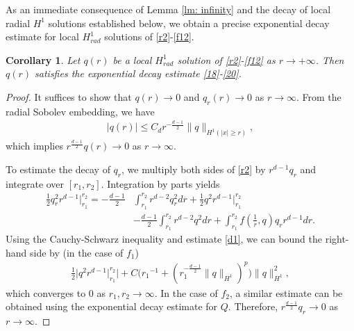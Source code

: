 \documentclass[12pt]{amsart}
\newtheorem{corollary}[theorem]{Corollary}
\newtheorem{remark}[theorem]{Remark}
\begin{document}
As an immediate consequence of Lemma \ref{lm: infinity}  and the decay of local radial $H^1$ solutions established below, we obtain a precise exponential decay estimate for local $H^1_{rad}$ solutions of \eqref{r2}-\eqref{f12}. 
\begin{corollary}\label{cor: infinity}
Let $q(r)$ be a local $H^1_{rad}$ solution of \eqref{r2}-\eqref{f12} as $r\to +\infty$. Then $q(r)$ satisfies the exponential decay estimate \eqref{18}-\eqref{20}. 
\end{corollary}

\begin{proof}
It suffices to show that $q(r)\to 0$ and $q_r(r)\to 0$ as $r\to \infty$. From the radial Sobolev embedding, we have
\begin{align}\label{d1}
|q(r)|\le C_d r^{-\frac{d-1}2}\|q\|_{H^1(|x|\ge r)}, 
\end{align}
which implies  $r^{\frac{d-1}2}q(r)\to 0$ as $r\to \infty$. 

To estimate the decay of $q_r$, we multiply both sides of \eqref{r2} by $r^{d-1} q_r$ and integrate over $[r_1, r_2]$. Integration by parts yields
 \begin{align*}
 \tfrac 12 q_r^2 r^{d-1}|_{r_1}^{r_2}=-\tfrac {d-1}2 &\int_{r_1}^{r_2} r^{d-2} q_r^2 dr+\tfrac 12 q^2 r^{d-1}|_{r_1}^{r_2}\\
 &-
 \tfrac{d-1}2 \int_{r_1}^{r_2} r^{d-2} q^2 dr +\int_{r_1}^{r_2}f(\tfrac 1r, q) q_r r^{d-1}dr . 
 \end{align*}
 Using the Cauchy-Schwarz inequality and estimate \eqref{d1},  we can bound the right-hand side by (in the case of $f_1$)
 \begin{align*}
 \tfrac 12 \big| q^2 r^{d-1}|_{r_1}^{r_2} \big| +C\big({r_1}^{-1}+(r_1^{-\frac{d-1}2} \|q\|_{H^1} )^p\big)\|q\|_{H^1}^2,
 \end{align*}
which converges to 0 as $r_1, r_2\to\infty$. In the case of $f_2$, a similar estimate can be obtained using the exponential decay estimate for $Q$. Therefore, $ r^{\frac{d-1}2}q_r\to 0$ as $r\to \infty$. 
\end{proof}

\end{document}
